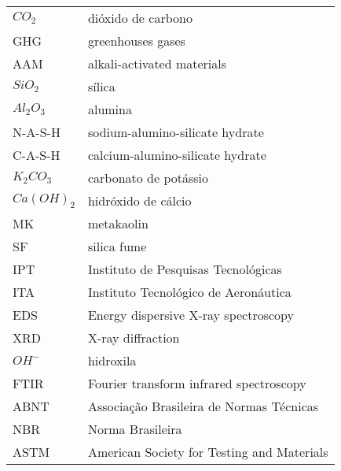 \begin{longtable}{ll}
$CO_2$ & dióxido de carbono \\
GHG & greenhouses gases \\
AAM & alkali-activated materials \\
$ SiO_2$ & sílica \\
$ Al_2O_3$ & alumina \\
N-A-S-H & sodium-alumino-silicate hydrate \\
C-A-S-H & calcium-alumino-silicate hydrate \\
$K_2CO_3$ & carbonato de potássio \\
$Ca(OH)_2$ & hidróxido de cálcio \\
MK & metakaolin \\
SF & silica fume \\
IPT & Instituto de Pesquisas Tecnológicas \\
ITA & Instituto Tecnológico de Aeronáutica \\
EDS & Energy dispersive X-ray spectroscopy \\
XRD & X-ray diffraction \\
$OH^-$ & hidroxila \\
FTIR & Fourier transform infrared spectroscopy \\
ABNT & Associação Brasileira de Normas Técnicas \\
NBR & Norma Brasileira \\
ASTM & American Society for Testing and Materials \\

\end{longtable}


